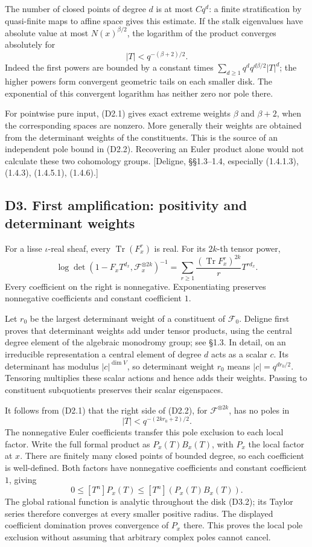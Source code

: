 The number of closed points of degree \(d\) is at most \(Cq^d\): a
finite stratification by quasi-finite maps to affine space gives this
estimate. If the stalk eigenvalues have absolute value at most
\(N(x)^{\beta/2}\), the logarithm of the product converges absolutely
for \[
|T|<q^{-(\beta+2)/2}.
\tag{D2.3}
\] Indeed the first powers are bounded by a constant times
\(\sum_{d\ge1}q^dq^{d\beta/2}|T|^d\); the higher powers form convergent
geometric tails on each smaller disk. The exponential of this convergent
logarithm has neither zero nor pole there.

For pointwise pure input, (D2.1) gives exact extreme weights \(\beta\)
and \(\beta+2\), when the corresponding spaces are nonzero. More
generally their weights are obtained from the determinant weights of the
constituents. This is the source of an independent pole bound in (D2.2).
Recovering an Euler product alone would not calculate these two
cohomology groups. {[}Deligne, §§1.3--1.4, especially (1.4.1.3),
(1.4.3), (1.4.5.1), (1.4.6).{]}

\subsection{D3. First amplification: positivity and determinant
weights}\label{d3.-first-amplification-positivity-and-determinant-weights}

For a lisse \(\iota\)-real sheaf, every \(\operatorname{Tr}(F_x^r)\) is
real. For its \(2k\)-th tensor power, \[
\log\det(1-F_xT^{d_x},\mathcal F_x^{\otimes2k})^{-1}
=\sum_{r\ge1}\frac{(\operatorname{Tr}F_x^r)^{2k}}rT^{rd_x}.
\tag{D3.1}
\] Every coefficient on the right is nonnegative. Exponentiating
preserves nonnegative coefficients and constant coefficient \(1\).

Let \(r_0\) be the largest determinant weight of a constituent of
\(\mathcal F_0\). Deligne first proves that determinant weights add
under tensor products, using the central degree element of the algebraic
monodromy group; see §1.3. In detail, on an irreducible representation a
central element of degree \(d\) acts as a scalar \(c\). Its determinant
has modulus \(|c|^{\dim V}\), so determinant weight \(r_0\) means
\(|c|=q^{dr_0/2}\). Tensoring multiplies these scalar actions and hence
adds their weights. Passing to constituent subquotients preserves their
scalar eigenspaces.

It follows from (D2.1) that the right side of (D2.2), for
\(\mathcal F^{\otimes2k}\), has no poles in \[
|T|<q^{-(2kr_0+2)/2}.
\tag{D3.2}
\] The nonnegative Euler coefficients transfer this pole exclusion to
each local factor. Write the full formal product as \(P_x(T)B_x(T)\),
with \(P_x\) the local factor at \(x\). There are finitely many closed
points of bounded degree, so each coefficient is well-defined. Both
factors have nonnegative coefficients and constant coefficient \(1\),
giving \[
0\le[T^n]P_x(T)\le[T^n](P_x(T)B_x(T)).
\] The global rational function is analytic throughout the disk (D3.2);
its Taylor series therefore converges at every smaller positive radius.
The displayed coefficient domination proves convergence of \(P_x\)
there. This proves the local pole exclusion without assuming that
arbitrary complex poles cannot cancel.

